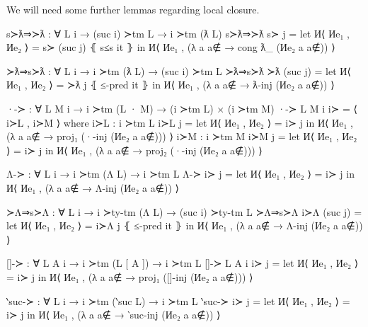 \documentclass[logo,bsc,singlespacing,parskip,online]{infthesis}
\renewenvironment{code}{\mintedcopy[breaklines,breaksymbolleft=\;]{agda}}{\endmintedcopy}
\begin{document}
We will need some further lemmas regarding local closure.
\begin{code}

  s≻ƛ⇒≻ƛ : ∀ {L i} → (suc i) ≻tm L → i ≻tm (ƛ L)
  s≻ƛ⇒≻ƛ s≻ j = let И⟨ Иe₁ , Иe₂ ⟩ = s≻ (suc j) ⦃ s≤s it ⦄
    in И⟨ Иe₁ , (λ a {a∉} → cong ƛ_ (Иe₂ a {a∉})) ⟩

  ≻ƛ⇒s≻ƛ : ∀ {L i} → i ≻tm (ƛ L) → (suc i) ≻tm L
  ≻ƛ⇒s≻ƛ ≻ƛ (suc j) = let И⟨ Иe₁ , Иe₂ ⟩ = ≻ƛ j ⦃ ≤-pred it ⦄
    in И⟨ Иe₁ , (λ a {a∉} → ƛ-inj (Иe₂ a {a∉})) ⟩

  ·-≻ : ∀ {L M i} → i ≻tm (L · M) → (i ≻tm L) × (i ≻tm M)
  ·-≻ {L} {M} {i} i≻ = ⟨ i≻L , i≻M ⟩
    where
      i≻L : i ≻tm L
      i≻L j = let И⟨ Иe₁ , Иe₂ ⟩ = i≻ j
        in И⟨ Иe₁ , (λ a {a∉} → proj₁ (·-inj (Иe₂ a {a∉}))) ⟩
      i≻M : i ≻tm M
      i≻M j = let И⟨ Иe₁ , Иe₂ ⟩ = i≻ j
        in И⟨ Иe₁ , (λ a {a∉} → proj₂ (·-inj (Иe₂ a {a∉}))) ⟩

  Λ-≻ : ∀ {L i} → i ≻tm (Λ L) → i ≻tm L
  Λ-≻ i≻ j = let И⟨ Иe₁ , Иe₂ ⟩ = i≻ j
    in И⟨ Иe₁ , (λ a {a∉} → Λ-inj (Иe₂ a {a∉})) ⟩

  ≻Λ⇒s≻Λ : ∀ {L i} → i ≻ty-tm (Λ L) → (suc i) ≻ty-tm L
  ≻Λ⇒s≻Λ i≻Λ (suc j) = let И⟨ Иe₁ , Иe₂ ⟩ = i≻Λ j ⦃ ≤-pred it ⦄
    in И⟨ Иe₁ , (λ a {a∉} → Λ-inj (Иe₂ a {a∉})) ⟩

  []-≻ : ∀ {L A i} → i ≻tm (L [ A ]) → i ≻tm L
  []-≻ {L} {A} {i} i≻ j = let И⟨ Иe₁ , Иe₂ ⟩ = i≻ j
    in И⟨ Иe₁ , (λ a {a∉} → proj₁ ([]-inj (Иe₂ a {a∉}))) ⟩

  ‵suc-≻ : ∀ {L i} → i ≻tm (‵suc L) → i ≻tm L
  ‵suc-≻ i≻ j = let И⟨ Иe₁ , Иe₂ ⟩ = i≻ j
    in И⟨ Иe₁ , (λ a {a∉} → ‵suc-inj (Иe₂ a {a∉})) ⟩
\end{code}
\end{document}
